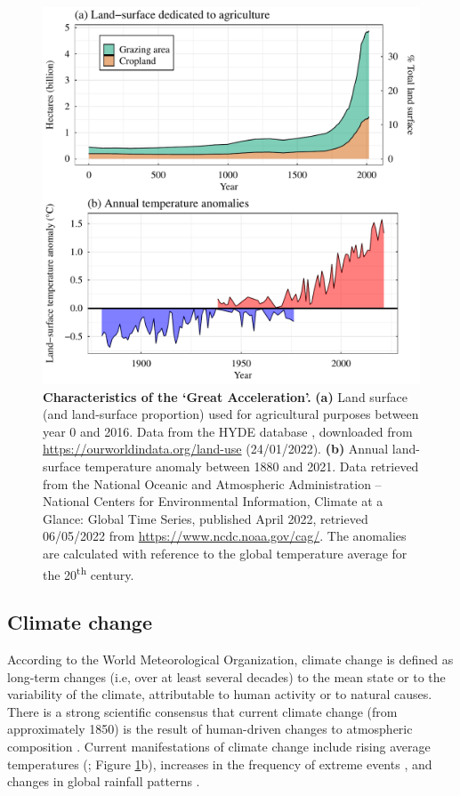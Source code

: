 \begin{figure}[h!]
\centering
\includegraphics[scale=0.55]{figures/Chapter1/Intro_plot}
\caption[Characteristics of the `Great Acceleration']{\textbf{Characteristics of the `Great Acceleration'.} \textbf{(a)} Land surface (and land-surface proportion) used for agricultural purposes between year 0 and 2016. Data from the HYDE database \citep{Goldewijk2017}, downloaded from \url{https://ourworldindata.org/land-use} (24/01/2022). \textbf{(b)} Annual land-surface temperature anomaly between 1880 and 2021. Data retrieved from the National Oceanic and Atmospheric Administration – National Centers for Environmental Information, Climate at a Glance: Global Time Series, published April 2022, retrieved 06/05/2022 from \url{https://www.ncdc.noaa.gov/cag/}. The anomalies are calculated with reference to the global temperature average for the 20\textsuperscript{th} century. }
\label{Introduction_fig1}
\end{figure}

\subsection{Climate change}

According to the World Meteorological Organization, climate change is defined as long-term changes (i.e, over at least several decades) to the mean state or to the variability of the climate, attributable to human activity or to natural causes. There is a strong scientific consensus that current climate change (from approximately 1850) is the result of human-driven changes to atmospheric composition \citep{Crowley2000, IPCC2013, Maibach2014}. Current manifestations of climate change include rising average temperatures (\citet{Valipour2021}; Figure \ref{Introduction_fig1}b), increases in the frequency of extreme events \citep{Seneviratne2012}, and changes in global rainfall patterns \citep{Dore2005, Trenberth2011}. 

